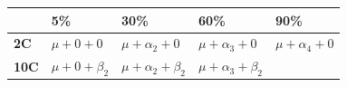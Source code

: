 \documentclass[]{book}
\theoremstyle{definition}
\theoremstyle{definition}
\theoremstyle{remark}
\begin{document}
\begin{longtable}[]{@{}lllll@{}}
\toprule
\begin{minipage}[b]{0.08\columnwidth}\raggedright\strut
\strut
\end{minipage} & \begin{minipage}[b]{0.14\columnwidth}\raggedright\strut
\textbf{5\%}\strut
\end{minipage} & \begin{minipage}[b]{0.22\columnwidth}\raggedright\strut
\textbf{30\%}\strut
\end{minipage} & \begin{minipage}[b]{0.21\columnwidth}\raggedright\strut
\textbf{60\%}\strut
\end{minipage} & \begin{minipage}[b]{0.21\columnwidth}\raggedright\strut
\textbf{90\%}\strut
\end{minipage}\tabularnewline
\midrule
\endhead
\begin{minipage}[t]{0.08\columnwidth}\raggedright\strut
\textbf{2C}\strut
\end{minipage} & \begin{minipage}[t]{0.14\columnwidth}\raggedright\strut
\(\mu+0+0\)\strut
\end{minipage} & \begin{minipage}[t]{0.22\columnwidth}\raggedright\strut
\(\mu+\alpha_2+0\)\strut
\end{minipage} & \begin{minipage}[t]{0.21\columnwidth}\raggedright\strut
\(\mu+\alpha_3+0\)\strut
\end{minipage} & \begin{minipage}[t]{0.21\columnwidth}\raggedright\strut
\(\mu+\alpha_4+0\)\strut
\end{minipage}\tabularnewline
\begin{minipage}[t]{0.08\columnwidth}\raggedright\strut
\textbf{10C}\strut
\end{minipage} & \begin{minipage}[t]{0.14\columnwidth}\raggedright\strut
\(\mu+0+\beta_2\)\strut
\end{minipage} & \begin{minipage}[t]{0.22\columnwidth}\raggedright\strut
\(\mu+\alpha_2+\beta_2\)\strut
\end{minipage} & \begin{minipage}[t]{0.21\columnwidth}\raggedright\strut
\(\mu+\alpha_3+\beta_2\)\strut
\end{minipage} & \begin{minipage}[t]{0.21\columnwidth}\raggedright\strut

\end{minipage}
\end{longtable}
\end{document}
